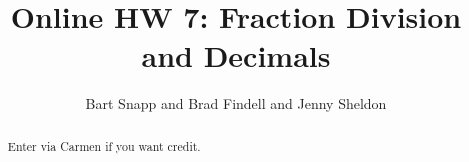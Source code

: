 \documentclass[handout,space,nooutcomes]{xourse}
\title{Online HW 7: Fraction Division and Decimals}
\author{Bart Snapp and Brad Findell and Jenny Sheldon}
\begin{document}
\begin{abstract}
Enter via Carmen if you want credit.   
\end{abstract}
\maketitle


\end{document}
